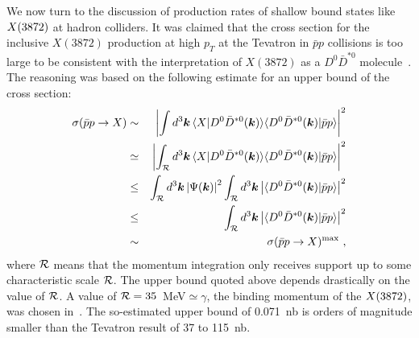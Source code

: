 We now turn to the discussion of production rates of shallow bound states
like $X(3872)$ at hadron colliders. It was claimed  that
the cross section for the inclusive $X(3872)$ production at high $p_T$ at the
Tevatron in $\bar pp$ collisions is too large to be consistent with the
interpretation of $X(3872)$ as a $D^0\bar D^{*0}$
molecule~\cite{Bignamini:2009sk}. The reasoning was based on the following
estimate for an upper
bound of the cross section:
\begin{eqnarray}
\sigma(\bar pp\to X) &\sim& \left| \int d^3{\bm k}\,\langle X|D^0\bar D^{*0}
({\bm k})\rangle\langle D^0\bar D^{*0}({\bm k})|\bar pp\rangle\right|^2
\nonumber \\
&\simeq& \left| \int_{\cal R} d^3{\bm k}\,\langle X|D^0\bar D^{*0}({\bm
k}) \rangle\langle D^0\bar D^{*0}({\bm k})|\bar pp\rangle\right|^2 \nonumber
\\
&\leq& \int_{\cal R} d^3 {\bm k} \left|\Psi({\bm k})\right|^2
\int_{\cal R} d^3 {\bm k}\left|\langle D^0\bar D^{*0}({\bm k})|\bar
pp\rangle\right|^2 \nonumber \\
&\leq& \int_{\cal R} d^3 {\bm k}\left|\langle D^0\bar D^{*0}({\bm
k})|\bar pp\rangle\right|^2 \nonumber \\ &\sim&
\sigma(\bar pp\to X)^{\rm max} \ ,
\label{eq:keyargument}
\end{eqnarray}
%
where $\cal R$ means that the momentum integration only receives support up to
some characteristic scale
$\cal R$. The upper bound quoted above depends drastically on the value of
$\cal R$. A value of ${\cal R}=35$~MeV$\simeq\gamma$, the binding momentum of
the $X(3872)$, was chosen in~\cite{Bignamini:2009sk}. The so-estimated upper
bound of 0.071~nb is orders of magnitude smaller than the Tevatron result
of 37 to 115~nb.


